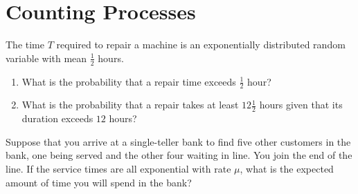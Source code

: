 \section{Counting Processes}
\label{sec:counting-processes}

\setcounter{exercise}{0}
\begin{exercise}
\label{ex:counting-processes-1}
The time $T$ required to repair a machine is an exponentially distributed random variable with mean $\frac12$ hours.
\begin{enumerate}
\item What is the probability that a repair time exceeds $\frac12$ hour?
\item What is the probability that a repair takes at least $12\frac12$ hours given that its duration exceeds $12$ hours?
\end{enumerate}
\end{exercise}


\begin{exercise}
\label{ex:counting-processes-2}
Suppose that you arrive at a single-teller bank to find five other customers in the bank, one being served and the other four waiting in line. You join the end of the line. If the service times are all exponential with rate $\mu$, what is the expected amount of time you will spend in the bank?
\end{exercise}



